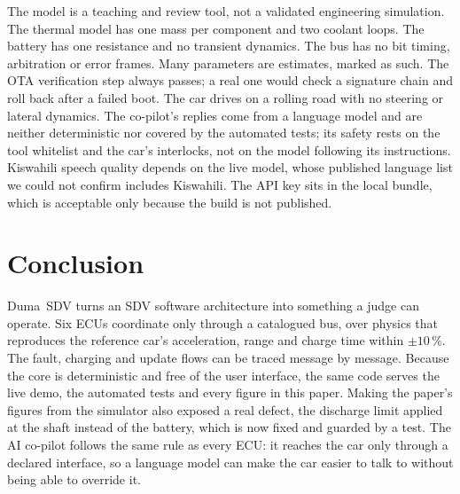\documentclass[10pt]{article}
\newcommand{\sdv}{Duma~SDV}
\begin{document}
The model is a teaching and review tool, not a validated engineering simulation. The thermal model has one mass per component and two coolant loops. The battery has one resistance and no transient dynamics. The bus has no bit timing, arbitration or error frames. Many parameters are estimates, marked as such. The OTA verification step always passes; a real one would check a signature chain and roll back after a failed boot. The car drives on a rolling road with no steering or lateral dynamics. The co-pilot's replies come from a language model and are neither deterministic nor covered by the automated tests; its safety rests on the tool whitelist and the car's interlocks, not on the model following its instructions. Kiswahili speech quality depends on the live model, whose published language list we could not confirm includes Kiswahili. The API key sits in the local bundle, which is acceptable only because the build is not published.

\section{Conclusion}

\sdv{} turns an SDV software architecture into something a judge can operate. Six ECUs coordinate only through a catalogued bus, over physics that reproduces the reference car's acceleration, range and charge time within $\pm 10\,\%$. The fault, charging and update flows can be traced message by message. Because the core is deterministic and free of the user interface, the same code serves the live demo, the automated tests and every figure in this paper. Making the paper's figures from the simulator also exposed a real defect, the discharge limit applied at the shaft instead of the battery, which is now fixed and guarded by a test. The AI co-pilot follows the same rule as every ECU: it reaches the car only through a declared interface, so a language model can make the car easier to talk to without being able to override it.



\end{document}
